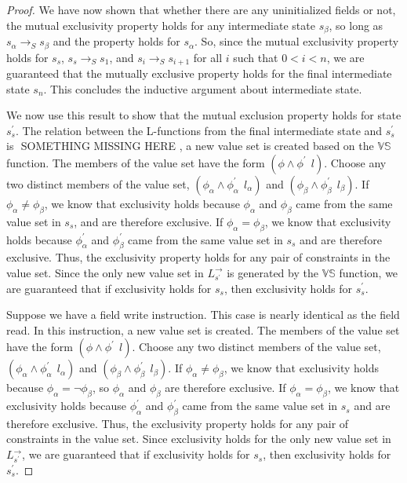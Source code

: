 \begin{proof}
We have now shown that whether there are any uninitialized fields or not, the mutual exclusivity property holds for any intermediate state $s_\beta$, so long as $s_\alpha \rightarrow_S s_\beta$ and the property holds for $s_\alpha$. 
So, since the mutual exclusivity property holds for $s_s$, $s_s \rightarrow_S s_1$, and $s_{i} \rightarrow_S s_{i+1} $ for all $i$ such that $0 < i < n$, we are guaranteed that the mutually exclusive property holds for the final intermediate state $s_n$. This concludes the inductive argument about intermediate state.

We now use this result to show that the mutual exclusion property holds for state $s_s^\prime$. The relation between the L-functions from the final intermediate state and $s_s^\prime$ is $ $  SOMETHING MISSING HERE , a new value set is created based on the $\mathbb{VS}$ function. The members of the value set have the form $(\phi\wedge \phi^\prime\ \ l)$. Choose any two distinct members of the value set, $(\phi_\alpha \wedge \phi_\alpha^\prime\ \ l_\alpha)$ and $(\phi_\beta \wedge \phi_\beta^\prime\ \ l_\beta)$. If $\phi_\alpha \ne \phi_\beta$, we know that exclusivity holds because $\phi_\alpha$ and $\phi_\beta$ came from the same value set in $s_s$, and are therefore exclusive. If $\phi_\alpha = \phi_\beta$, we know that exclusivity holds because $\phi_\alpha^\prime$ and $\phi_\beta^\prime$ came from the same value set in $s_s$ and are therefore exclusive. Thus, the exclusivity property holds for any pair of constraints in the value set. Since the only new value set in $L_{s^\prime}^\rightarrow$ is generated by the $\mathbb{VS}$ function, we are guaranteed that if exclusivity holds for $s_s$, then exclusivity holds for $s_s^\prime$.

Suppose we have a field write instruction. This case is nearly identical as the field read. In this instruction, a new value set is created. The members of the value set have the form $(\phi\wedge \phi^\prime\ \ l)$. Choose any two distinct members of the value set, $(\phi_\alpha \wedge \phi_\alpha^\prime\ \ l_\alpha)$ and $(\phi_\beta \wedge \phi_\beta^\prime\ \ l_\beta)$. If $\phi_\alpha \ne \phi_\beta$, we know that exclusivity holds because $\phi_\alpha = \neg \phi_\beta$, so $\phi_\alpha$ and $\phi_\beta$ are therefore exclusive. If $\phi_\alpha = \phi_\beta$, we know that exclusivity holds because $\phi_\alpha^\prime$ and $\phi_\beta^\prime$ came from the same value set in $s_s$ and are therefore exclusive. Thus, the exclusivity property holds for any pair of constraints in the value set. Since exclusivity holds for the only new value set in $L_{s^\prime}^\rightarrow$, we are guaranteed that if exclusivity holds for $s_s$, then exclusivity holds for $s_s^\prime$.


\end{proof}
